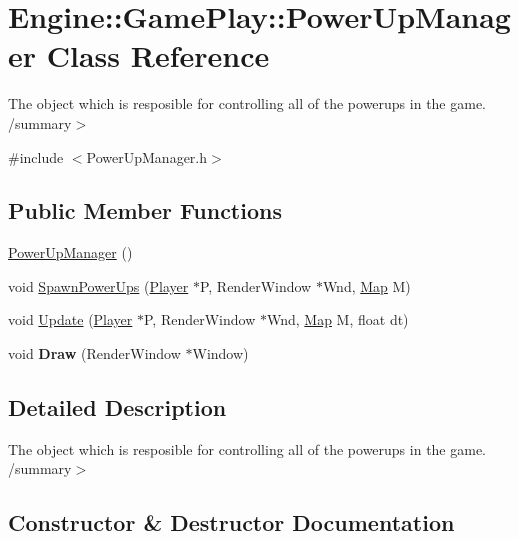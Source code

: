 \hypertarget{class_engine_1_1_game_play_1_1_power_up_manager}{}\section{Engine\+:\+:Game\+Play\+:\+:Power\+Up\+Manager Class Reference}
\label{class_engine_1_1_game_play_1_1_power_up_manager}


The object which is resposible for controlling all of the powerups in the game. /summary$>$  




{\ttfamily \#include $<$Power\+Up\+Manager.\+h$>$}

\subsection*{Public Member Functions}
\begin{DoxyCompactItemize}
\item 
\hyperlink{class_engine_1_1_game_play_1_1_power_up_manager_a459ae4b757b4f4c5e3dff626460639cd}{Power\+Up\+Manager} ()
\item 
void \hyperlink{class_engine_1_1_game_play_1_1_power_up_manager_aed4a80a6633ffcf652c05b568d299459}{Spawn\+Power\+Ups} (\hyperlink{class_engine_1_1_game_play_1_1_player}{Player} $\ast$P, Render\+Window $\ast$Wnd, \hyperlink{class_engine_1_1_core_1_1_map}{Map} M)
\item 
void \hyperlink{class_engine_1_1_game_play_1_1_power_up_manager_a7c64c6a0d310ae2662327bac1f602bec}{Update} (\hyperlink{class_engine_1_1_game_play_1_1_player}{Player} $\ast$P, Render\+Window $\ast$Wnd, \hyperlink{class_engine_1_1_core_1_1_map}{Map} M, float dt)
\item 
\mbox{\label{class_engine_1_1_game_play_1_1_power_up_manager_a8b8a5889b0787f1ae303cb24b3d84481}} 
void {\bfseries Draw} (Render\+Window $\ast$Window)
\end{DoxyCompactItemize}


\subsection{Detailed Description}
The object which is resposible for controlling all of the powerups in the game. /summary$>$ 

\subsection{Constructor \& Destructor Documentation}
\mbox{\label{class_engine_1_1_game_play_1_1_power_up_manager_a459ae4b757b4f4c5e3dff626460639cd}} 
